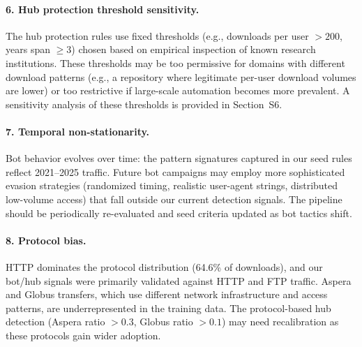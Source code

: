 \documentclass[11pt,a4paper]{article}
\begin{document}
\paragraph{6. Hub protection threshold sensitivity.}
The hub protection rules use fixed thresholds (e.g., downloads per user $>200$, years span $\geq3$) chosen based on empirical inspection of known research institutions.
These thresholds may be too permissive for domains with different download patterns (e.g., a repository where legitimate per-user download volumes are lower) or too restrictive if large-scale automation becomes more prevalent.
A sensitivity analysis of these thresholds is provided in Section~S6.

\paragraph{7. Temporal non-stationarity.}
Bot behavior evolves over time: the pattern signatures captured in our seed rules reflect 2021--2025 traffic.
Future bot campaigns may employ more sophisticated evasion strategies (randomized timing, realistic user-agent strings, distributed low-volume access) that fall outside our current detection signals.
The pipeline should be periodically re-evaluated and seed criteria updated as bot tactics shift.

\paragraph{8. Protocol bias.}
HTTP dominates the protocol distribution (64.6\% of downloads), and our bot/hub signals were primarily validated against HTTP and FTP traffic.
Aspera and Globus transfers, which use different network infrastructure and access patterns, are underrepresented in the training data.
The protocol-based hub detection (Aspera ratio $>0.3$, Globus ratio $>0.1$) may need recalibration as these protocols gain wider adoption.



\end{document}
